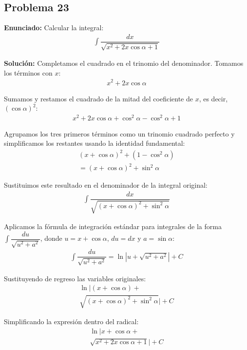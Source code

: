 \subsection*{Problema 23}

\textbf{Enunciado:} Calcular la integral:
\begin{align*}
  \int \dfrac{dx}{\sqrt{x^2 + 2x \cos\alpha + 1}}
\end{align*}

\textbf{Solución:} \newline
Completamos el cuadrado en el trinomio del denominador. 
Tomamos los términos con $x$:
\begin{align*}
  x^2 + 2x \cos\alpha
\end{align*}

Sumamos y restamos el cuadrado de la mitad del coeficiente de $x$, es decir, $(\cos\alpha)^2$:
\begin{align*}
  x^2 + 2x \cos\alpha + \cos^2\alpha - \cos^2\alpha + 1
\end{align*}

Agrupamos los tres primeros términos como un trinomio cuadrado perfecto y simplificamos los restantes usando la identidad fundamental:
\begin{align*}
  (x + \cos\alpha)^2 + (1 - \cos^2\alpha) \\
  = (x + \cos\alpha)^2 + \sin^2\alpha
\end{align*}

Sustituimos este resultado en el denominador de la integral original:
\begin{align*}
  \int \dfrac{dx}{\sqrt{(x + \cos\alpha)^2 + \sin^2\alpha}}
\end{align*}

Aplicamos la fórmula de integración estándar para integrales de la forma $\int \dfrac{du}{\sqrt{u^2 + a^2}}$, donde $u = x + \cos\alpha$, $du = dx$ y $a = \sin\alpha$:
\begin{align*}
  \int \dfrac{du}{\sqrt{u^2 + a^2}} = \ln\left|u + \sqrt{u^2 + a^2}\right| + C
\end{align*}

Sustituyendo de regreso las variables originales:
\begin{align*}
  \ln\Big|(x + \cos\alpha) + \\
  \sqrt{(x + \cos\alpha)^2 + \sin^2\alpha}\Big| + C
\end{align*}

Simplificando la expresión dentro del radical:
\begin{align*}
  \ln\Big|x + \cos\alpha + \\
  \sqrt{x^2 + 2x \cos\alpha + 1}\Big| + C
\end{align*}

